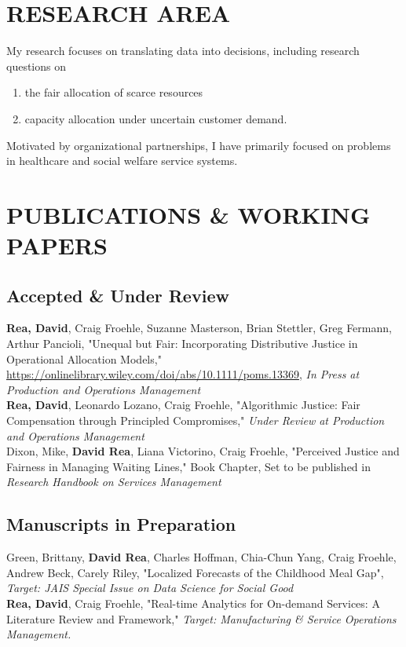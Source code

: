 \documentclass[12pt, letter]{moderncv}
\begin{document}
\smallskip
\section{RESEARCH AREA}
\smallskip
My research focuses on translating data into decisions, including research questions on
\smallskip 
\begin{enumerate}[\hspace{0.5cm}(1)]
	\item the fair allocation of scarce resources
	\item capacity allocation under uncertain customer demand.
\end{enumerate}
Motivated by organizational partnerships, I have primarily focused on problems in healthcare and social welfare service systems.
\smallskip
\section{PUBLICATIONS \& WORKING PAPERS}
\smallskip
\subsection{Accepted \& Under Review}
\smallskip
\textbf{Rea, David}, Craig Froehle, Suzanne Masterson, Brian Stettler, Greg Fermann, Arthur Pancioli, "Unequal but Fair: Incorporating Distributive Justice in Operational Allocation Models," \url{https://onlinelibrary.wiley.com/doi/abs/10.1111/poms.13369},\newline
\textit{In Press at Production and Operations Management}
\medskip\\ 
\textbf{Rea, David}, Leonardo Lozano, Craig Froehle,  "Algorithmic Justice: Fair Compensation through Principled Compromises," \textit{Under Review at Production and Operations Management}
\medskip\\
Dixon, Mike, \textbf{David Rea}, Liana Victorino, Craig Froehle, "Perceived Justice and Fairness in Managing Waiting Lines," Book Chapter, Set to be published in \textit{Research Handbook on Services Management}
\subsection{Manuscripts in Preparation}
Green, Brittany, \textbf{David Rea}, Charles Hoffman, Chia-Chun Yang, Craig Froehle, Andrew Beck, Carely Riley, "Localized Forecasts of the Childhood Meal Gap", \textit{Target: JAIS Special Issue on Data Science for Social Good}
\medskip \\
%
\textbf{Rea, David}, Craig Froehle, "Real-time Analytics for On-demand Services: A Literature Review and Framework," \textit{Target: Manufacturing \& Service Operations Management.}
\end{document}
